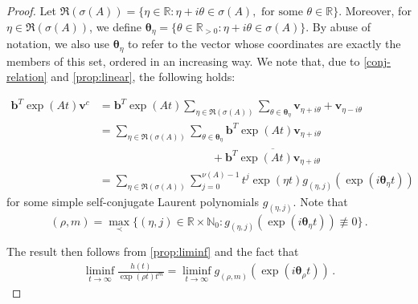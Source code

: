 \begin{proof}
  Let
  $\Re(\sigma(A))=\lbrace \eta\in\mathbb{R}:
  \eta+i\theta\in\sigma(A),\mbox{ for some }\theta\in\mathbb{R}
  \rbrace$. Moreover, for $\eta\in\Re(\sigma(A))$, we define
  $\boldsymbol{\theta}_{\eta}=\lbrace \theta\in\mathbb{R}_{>0}:
  \eta+i\theta \in\sigma(A) \rbrace$. By abuse of notation, we also
  use $\boldsymbol{\theta}_{\eta}$ to refer to the vector whose
  coordinates are exactly the members of this set, ordered in an
  increasing way. We note that, due to \cref{conj-relation}
  and \cref{prop:linear}, the
  following holds:

\begin{align*}
\boldsymbol{b}^{T}\exp(At)\boldsymbol{v}^{c} &= \boldsymbol{b}^{T} \exp(At) \sum\limits_{\eta\in\Re(\sigma(A))} \sum\limits_{\theta\in\boldsymbol{\theta}_{\eta}} \boldsymbol{v}_{\eta+i\theta}+\boldsymbol{v}_{\eta-i\theta} \\
&= \sum\limits_{\eta\in\Re(\sigma(A))} \sum\limits_{\theta\in\boldsymbol{\theta}_{\eta}} \boldsymbol{b}^{T} \exp(At) \boldsymbol{v}_{\eta+i\theta} \\
& \qquad \qquad \qquad \qquad \qquad + \overline{\boldsymbol{b}^{T} \exp(At) \boldsymbol{v}_{\eta+i\theta}} \\
& = \sum\limits_{\eta\in\Re(\sigma(A))} \sum\limits_{j=0}^{\nu(A)-1} t^{j}\exp(\eta t)  g_{(\eta,j)}( \exp(i\boldsymbol{\theta}_{\eta}t) )
\end{align*}
for some simple self-conjugate Laurent polynomials
$g_{(\eta,j)}$.
Note that
\begin{equation*}
(\rho,m)=\max\limits_{\prec} \lbrace (\eta,j)\in\mathbb{R}\times
\mathbb{N}_{0}: g_{(\eta,j)}(\exp(i\boldsymbol{\theta}_{\eta} t)) \not
\equiv 0 \rbrace \, .
\end{equation*}

The result then follows from \cref{prop:liminf} and the fact
that
\begin{align*}
\liminf\limits_{t\rightarrow\infty} \frac{h(t)}{\exp(\rho t)t^{m}}=
  \liminf\limits_{t\rightarrow\infty}
  g_{(\rho,m)}(\exp(i\boldsymbol{\theta}_{\rho} t)) \, .
\end{align*}
\end{proof}
